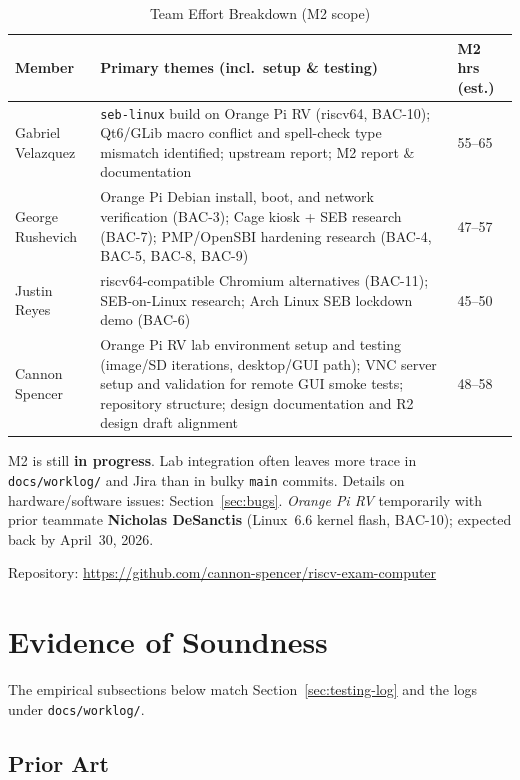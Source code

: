 \documentclass[11pt]{article}
\begin{document}
\begin{table}[h!]
\centering
\caption{Team Effort Breakdown (M2 scope)}
\label{tab:effort}
\begin{tabularx}{\textwidth}{|l|X|l|}
\hline
\textbf{Member} & \textbf{Primary themes (incl.\ setup \& testing)} & \textbf{M2 hrs (est.)} \\ \hline
Gabriel Velazquez &
  \texttt{seb-linux} build on Orange Pi RV (riscv64, BAC-10); Qt6/GLib macro conflict and spell-check type mismatch identified; upstream report; M2 report \& documentation &
  55--65 \\ \hline
George Rushevich &
  Orange Pi Debian install, boot, and network verification (BAC-3); Cage kiosk + SEB research (BAC-7); PMP/OpenSBI hardening research (BAC-4, BAC-5, BAC-8, BAC-9) &
  47--57 \\ \hline
Justin Reyes &
  riscv64-compatible Chromium alternatives (BAC-11); SEB-on-Linux research; Arch Linux SEB lockdown demo (BAC-6) &
  45--50 \\ \hline
Cannon Spencer &
  Orange Pi RV lab environment setup and testing (image/SD iterations, desktop/GUI path); VNC server setup and validation for remote GUI smoke tests; repository structure; design documentation and R2 design draft alignment &
  48--58 \\ \hline
\end{tabularx}
\end{table}

\noindent M2 is still \textbf{in progress}. Lab integration often leaves more trace in \texttt{docs/worklog/} and Jira than in bulky \texttt{main} commits. Details on hardware/software issues: Section~\ref{sec:bugs}. \textit{Orange Pi RV} temporarily with prior teammate \textbf{Nicholas DeSanctis} (Linux~6.6 kernel flash, BAC-10); expected back by April~30, 2026.

\noindent Repository: \url{https://github.com/cannon-spencer/riscv-exam-computer}

\newpage
\section{Evidence of Soundness}

\noindent The empirical subsections below match Section~\ref{sec:testing-log} and the logs under \texttt{docs/worklog/}.

\subsection{Prior Art}
\end{document}
